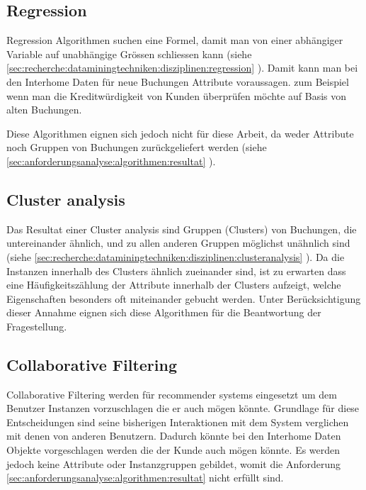 \subsection{Regression}
\label{sec:konzept:disziplinauswahl:regression}
Regression Algorithmen suchen eine Formel, damit man von einer abhängiger Variable auf unabhängige Grössen schliessen kann (siehe \cref{sec:recherche:dataminingtechniken:disziplinen:regression} ). Damit kann man bei den Interhome Daten für neue Buchungen Attribute voraussagen. zum Beispiel wenn man die Kreditwürdigkeit von Kunden überprüfen möchte auf Basis von alten Buchungen.

Diese Algorithmen eignen sich jedoch nicht für diese Arbeit, da weder Attribute noch Gruppen von Buchungen zurückgeliefert werden (siehe \cref{sec:anforderungsanalyse:algorithmen:resultat} ).

\subsection{Cluster analysis}
\label{sec:konzept:disziplinauswahl:clusteranalysis}
Das Resultat einer Cluster analysis sind Gruppen (Clusters) von Buchungen, die untereinander ähnlich, und zu allen anderen Gruppen möglichst unähnlich sind (siehe \cref{sec:recherche:dataminingtechniken:disziplinen:clusteranalysis} ). Da die Instanzen innerhalb des Clusters ähnlich zueinander sind, ist zu erwarten dass eine Häufigkeitszählung der Attribute innerhalb der Clusters aufzeigt, welche Eigenschaften besonders oft miteinander gebucht werden. Unter Berücksichtigung dieser Annahme eignen sich diese Algorithmen für die Beantwortung der Fragestellung.

\subsection{Collaborative Filtering}
\label{sec:konzept:disziplinauswahl:collaborativefiltering}
Collaborative Filtering werden für recommender systems eingesetzt um dem Benutzer Instanzen vorzuschlagen die er auch mögen könnte. Grundlage für diese Entscheidungen sind seine bisherigen Interaktionen mit dem System verglichen mit denen von anderen Benutzern. Dadurch könnte bei den Interhome Daten Objekte vorgeschlagen werden die der Kunde auch mögen könnte. Es werden jedoch keine Attribute oder Instanzgruppen gebildet, womit die Anforderung \cref{sec:anforderungsanalyse:algorithmen:resultat} nicht erfüllt sind.


